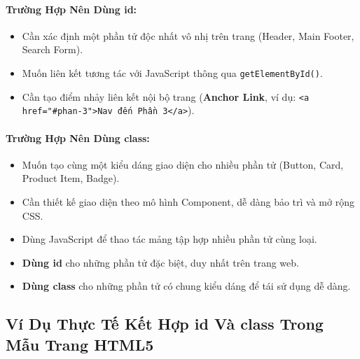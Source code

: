 \documentclass[11pt,oneside]{book}
\newcommand{\codeinline}[1]{\textcolor{accentOrange}{\texttt{#1}}}
\newcommand{\term}[1]{\textbf{\textcolor{primaryBlue}{#1}}}
\begin{document}
\paragraph{Trường Hợp Nên Dùng id:}
\begin{itemize}[leftmargin=1.8em, itemsep=3pt, parsep=0pt]
    \item Cần xác định một phần tử độc nhất vô nhị trên trang (Header, Main Footer, Search Form).
    \item Muốn liên kết tương tác với JavaScript thông qua \codeinline{getElementById()}.
    \item Cần tạo điểm nhảy liên kết nội bộ trang (\term{Anchor Link}, ví dụ: \codeinline{<a href="\#phan-3">Nav đến Phần 3</a>}).
\end{itemize}

\paragraph{Trường Hợp Nên Dùng class:}
\begin{itemize}[leftmargin=1.8em, itemsep=3pt, parsep=0pt]
    \item Muốn tạo cùng một kiểu dáng giao diện cho nhiều phần tử (Button, Card, Product Item, Badge).
    \item Cần thiết kế giao diện theo mô hình Component, dễ dàng bảo trì và mở rộng CSS.
    \item Dùng JavaScript để thao tác mảng tập hợp nhiều phần tử cùng loại.
\end{itemize}

\begin{conceptBox}
\begin{itemize}[leftmargin=1.5em, itemsep=2pt, parsep=0pt]
    \item \textbf{Dùng id} cho những phần tử đặc biệt, duy nhất trên trang web.
    \item \textbf{Dùng class} cho những phần tử có chung kiểu dáng để tái sử dụng dễ dàng.
\end{itemize}
\end{conceptBox}

\subsection{Ví Dụ Thực Tế Kết Hợp id Và class Trong Mẫu Trang HTML5}
\end{document}
